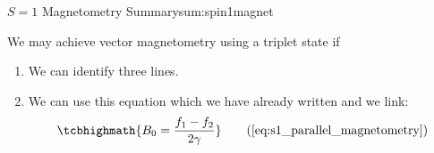 %

\begin{summary}{$S=1$ Magnetometry Summary}{sum:spin1magnet}

	We may achieve vector magnetometry using a triplet state if
	\begin{enumerate}
		\item We can identify three lines.
		\item We can use this equation which we have already written and we link:
		      \begin{equation}
                  \tcbhighmath{B_0 = \frac{f_1 - f_2}{2 \gamma}}
			      \tag{\ref{eq:s1_parallel_magnetometry}}
		      \end{equation}
	\end{enumerate}


\end{summary}
